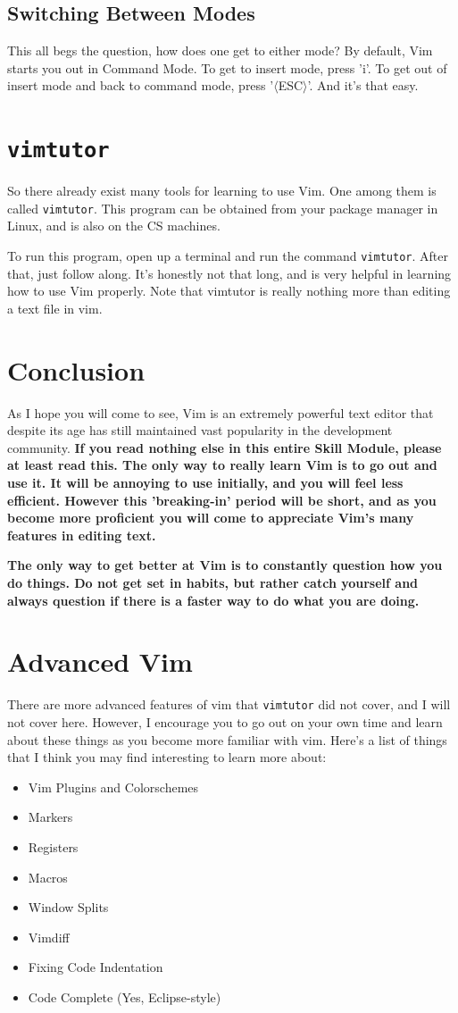 \subsection{Switching Between Modes}
This all begs the question, how does one get to either mode? By default, Vim
starts you out in Command Mode. To get to insert mode, press 'i'. To get out of
insert mode and back to command mode, press '$\langle$ESC$\rangle$'. And it's that easy.

\section{\texttt{vimtutor}}
So there already exist many tools for learning to use Vim. One among them is called
\texttt{vimtutor}. This program can be obtained from your package manager in Linux,
and is also on the CS machines.

To run this program, open up a terminal and run the command \texttt{vimtutor}.
After that, just follow along. It's honestly not that long, and is very
helpful in learning how to use Vim properly. Note that vimtutor is really nothing
more than editing a text file in vim. 

\section{Conclusion}
As I hope you will come to see, Vim is an extremely powerful text editor that
despite its age has still maintained vast popularity in the development
community. {\bf If you read nothing else in this entire Skill Module, please
at least read this. The only way to really learn Vim is to go out and use it.
It will be annoying to use initially, and you will feel less efficient. However
this 'breaking-in' period will be short, and as you become more proficient
you will come to appreciate Vim's many features in editing text.}

{\bf The only way to get better at Vim is to constantly question how you do 
things. Do not get set in habits, but rather catch yourself 
and always question if there is a faster way to do what you are doing.}

\section{Advanced Vim}
There are more advanced features of vim that \texttt{vimtutor} did not cover,
and I will not cover here. However, I encourage you to go out on your own time
and learn about these things as you become more familiar with vim. Here's
a list of things that I think you may find interesting to learn more about:
\begin{itemize}
\item Vim Plugins and Colorschemes
\item Markers
\item Registers
\item Macros
\item Window Splits
\item Vimdiff
\item Fixing Code Indentation
\item Code Complete (Yes, Eclipse-style)
\end{itemize}

